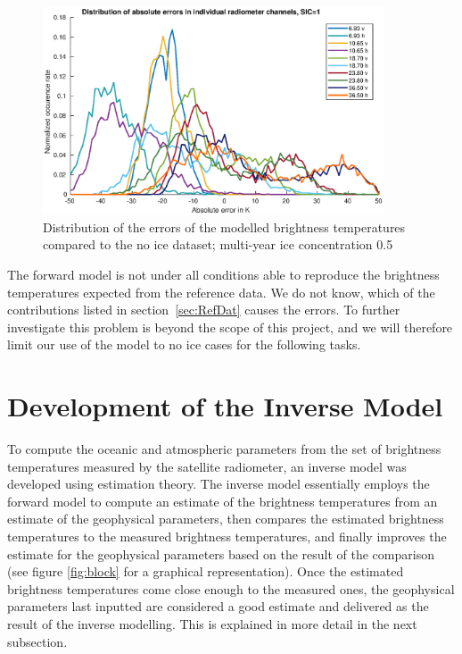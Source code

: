 \documentclass[11pt, a4paper]{article}
\begin{document}
\begin{figure}[h!]
   \centering
   \includegraphics[width=0.9\textwidth]{ValidationForward_SIC1_errordist.eps}
   \caption{Distribution of the errors of the modelled brightness temperatures compared to the no ice dataset; multi-year ice concentration 0.5}
   \label{fig:for1dist}
\end{figure}



The forward model is not under all conditions able to reproduce the brightness temperatures expected from the reference data. We do not know, which of the contributions listed in \mbox{section \ref{sec:RefDat}} causes the errors. To further investigate this problem is beyond the scope of this project, and we will therefore limit our use of the model to no ice cases for the following tasks.








\clearpage
\section{Development of the Inverse Model}

To compute the oceanic and atmospheric parameters from the set of brightness temperatures measured by the satellite radiometer, an inverse model was developed using estimation theory. The inverse model essentially employs the forward model to compute an estimate of the brightness temperatures from an estimate of the geophysical parameters, then compares the estimated brightness temperatures to the measured brightness temperatures, and finally improves the estimate for the geophysical parameters based on the result of the comparison (see figure \ref{fig:block} for a graphical representation). Once the estimated brightness temperatures come close enough to the measured ones, the geophysical parameters last inputted are considered a good estimate and delivered as the result of the inverse modelling. This is explained in more detail in the next subsection.
\newline
\end{document}
